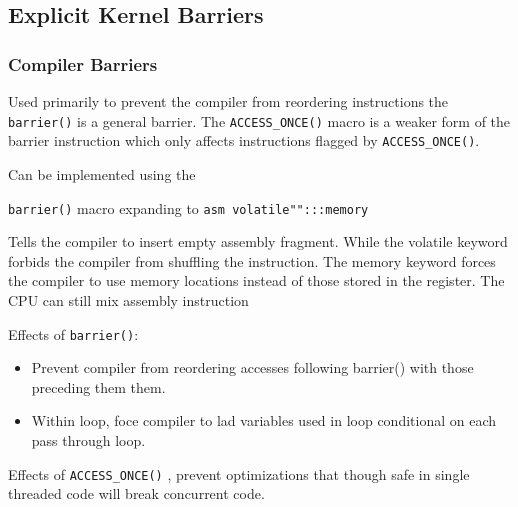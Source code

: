 \documentclass{article}
\begin{document}
\subsection{Explicit Kernel Barriers}

\subsubsection{Compiler Barriers}

Used primarily to prevent the compiler from reordering instructions
the \lstinline{barrier()} is a general barrier. The
\lstinline{ACCESS_ONCE()} macro is a weaker form of the barrier
instruction which only affects instructions flagged by
\lstinline{ACCESS_ONCE()}.

Can be implemented using the

\lstinline{barrier()} macro expanding to \lstinline{asm volatile"":::memory}

Tells the compiler to insert empty assembly fragment. While the
volatile keyword forbids the compiler from shuffling the instruction.
The memory keyword forces the compiler to use memory locations instead
of those stored in the register. The CPU can still mix assembly
instruction

Effects of \lstinline{barrier()}:

\begin{itemize}
  \item Prevent compiler from reordering accesses following barrier()
    with those preceding them them.

  \item Within loop, foce compiler to lad variables used in loop
    conditional on each pass through loop.    
\end{itemize}

Effects of \lstinline{ACCESS_ONCE()} , prevent optimizations that
though safe in single threaded code will break concurrent code.
\end{document}
